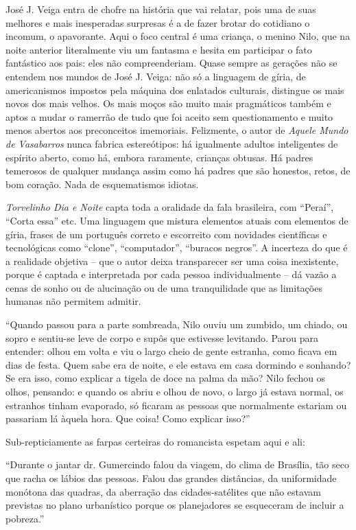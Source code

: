 \documentclass[
  letterpaper,
  DIV=11,
  numbers=noendperiod]{scrartcl}
\begin{document}
José J. Veiga entra de chofre na história que vai relatar, pois uma de
suas melhores e mais inesperadas surpresas é a de fazer brotar do
cotidiano o incomum, o apavorante. Aqui o foco central é uma criança, o
menino Nilo, que na noite anterior literalmente viu um fantasma e hesita
em participar o fato fantástico aos pais: eles não compreenderiam. Quase
sempre as gerações não se entendem nos mundos de José J. Veiga: não só a
linguagem de gíria, de americanismos impostos pela máquina dos enlatados
culturais, distingue os mais novos dos mais velhos. Os mais moços são
muito mais pragmáticos também e aptos a mudar o ramerrão de tudo que foi
aceito sem questionamento e muito menos abertos aos preconceitos
imemoriais. Felizmente, o autor de \emph{Aquele Mundo de Vasabarros}
nunca fabrica estereótipos: há igualmente adultos inteligentes de
espírito aberto, como há, embora raramente, crianças obtusas. Há padres
temerosos de qualquer mudança assim como há padres que são honestos,
retos, de bom coração. Nada de esquematismos idiotas.

\emph{Torvelinho Dia e Noite} capta toda a oralidade da fala brasileira,
com ``Peraí'', ``Corta essa'' etc. Uma linguagem que mistura elementos
atuais com elementos de gíria, frases de um português correto e
escorreito com novidades científicas e tecnológicas como ``clone'',
``computador'', ``buracos negros''. A incerteza do que é a realidade
objetiva -- que o autor deixa transparecer ser uma coisa inexistente,
porque é captada e interpretada por cada pessoa individualmente -- dá
vazão a cenas de sonho ou de alucinação ou de uma tranquilidade que as
limitações humanas não permitem admitir.

``Quando passou para a parte sombreada, Nilo ouviu um zumbido, um
chiado, ou sopro e sentiu-se leve de corpo e supôs que estivesse
levitando. Parou para entender: olhou em volta e viu o largo cheio de
gente estranha, como ficava em dias de festa. Quem sabe era de noite, e
ele estava em casa dormindo e sonhando? Se era isso, como explicar a
tigela de doce na palma da mão? Nilo fechou os olhos, pensando: e quando
os abriu e olhou de novo, o largo já estava normal, os estranhos tinham
evaporado, só ficaram as pessoas que normalmente estariam ou passariam
lá àquela hora. Que coisa! Como explicar isso?''

Sub-repticiamente as farpas certeiras do romancista espetam aqui e ali:

``Durante o jantar dr. Gumercindo falou da viagem, do clima de Brasília,
tão seco que racha os lábios das pessoas. Falou das grandes distâncias,
da uniformidade monótona das quadras, da aberração das cidades-satélites
que não estavam previstas no plano urbanístico porque os planejadores se
esqueceram de incluir a pobreza.''
\end{document}
